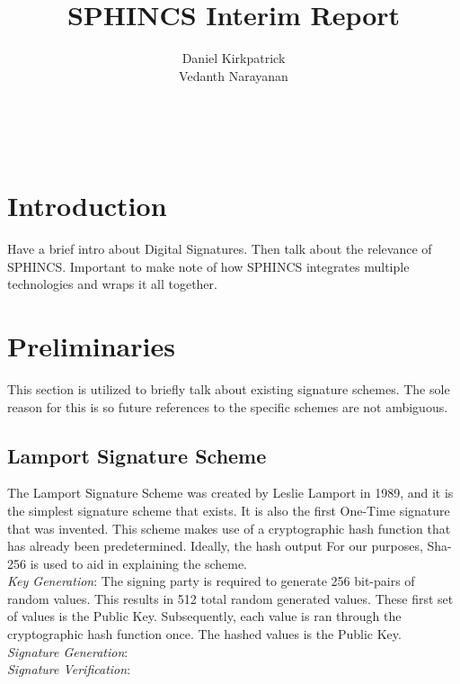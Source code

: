 \documentclass[]{scrartcl}
\title{SPHINCS Interim Report}
\author{Daniel Kirkpatrick\\Vedanth Narayanan}
\makeatletter
\renewcommand{\maketitle}{ %
	\begin{center} %
		{\LARGE\@title} %
		
		\vspace{15pt} %
		{\large\@author} %
		\\\@date %
		
	\end{center}
}
\makeatother
\begin{document}
\maketitle


\section*{Introduction}
Have a brief intro about Digital Signatures. Then talk about the relevance of SPHINCS. Important to make note of how SPHINCS integrates multiple technologies and wraps it all together.

\section*{Preliminaries}
This section is utilized to briefly talk about existing signature schemes. The sole reason for this is so future references to the specific schemes are not ambiguous. 

\subsection*{Lamport Signature Scheme}
The Lamport Signature Scheme was created by Leslie Lamport in 1989, and it is the simplest signature scheme that exists. It is also the first One-Time signature that was invented. This scheme makes use of a cryptographic hash function that has already been predetermined. Ideally, the hash output For our purposes, Sha-256 is used to aid in explaining the scheme.\\
\textit{Key Generation}: The signing party is required to generate 256 bit-pairs of random values. This results in 512 total random generated values. These first set of values is the Public Key. Subsequently, each value is ran through the cryptographic hash function once. The hashed values is the Public Key.\\
\textit{Signature Generation}: \\
\textit{Signature Verification}: 
\end{document}
